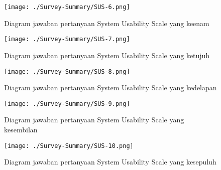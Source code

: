 \begin{figure}[H]
	\centering  
	\texttt{[image: ./Survey-Summary/SUS-6.png]}
	\caption[Diagram jawaban pertanyaan System Usability Scale yang keenam]{Diagram jawaban pertanyaan System Usability Scale yang keenam} 
	\label{fig:summary-SUS-6} 
\end{figure}

\begin{figure}[H]
	\centering  
	\texttt{[image: ./Survey-Summary/SUS-7.png]}
	\caption[Diagram jawaban pertanyaan System Usability Scale yang ketujuh]{Diagram jawaban pertanyaan System Usability Scale yang ketujuh} 
	\label{fig:summary-SUS-7} 
\end{figure}

\begin{figure}[H]
	\centering  
	\texttt{[image: ./Survey-Summary/SUS-8.png]}
	\caption[Diagram jawaban pertanyaan System Usability Scale yang kedelapan]{Diagram jawaban pertanyaan System Usability Scale yang kedelapan} 
	\label{fig:summary-SUS-8} 
\end{figure}

\begin{figure}[H]
	\centering  
	\texttt{[image: ./Survey-Summary/SUS-9.png]}
	\caption[Diagram jawaban pertanyaan System Usability Scale yang kesembilan]{Diagram jawaban pertanyaan System Usability Scale yang kesembilan} 
	\label{fig:summary-SUS-9} 
\end{figure}

\begin{figure}[H]
	\centering  
	\texttt{[image: ./Survey-Summary/SUS-10.png]}
	\caption[Diagram jawaban pertanyaan System Usability Scale yang kesepuluh]{Diagram jawaban pertanyaan System Usability Scale yang kesepuluh} 
	\label{fig:summary-SUS-10} 
\end{figure}